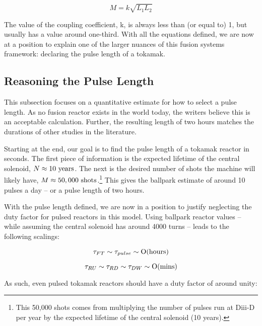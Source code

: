 \begin{equation}
	M = k \sqrt{ L_1 L_2 }
\end{equation}

The value of the coupling coefficient, k, is always less than (or equal to) 1, but usually has a value around one-third. With all the equations defined, we are now at a position to explain one of the larger nuances of this fusion systems framework: declaring the pulse length of a tokamak.

\subsection{Reasoning the Pulse Length}

\label{section:pulse}

This subsection focuses on a quantitative estimate for how to select a pulse length. As no fusion reactor exists in the world today, the writers believe this is an acceptable calculation. Further, the resulting length of two hours matches the durations of other studies in the literature.

Starting at the end, our goal is to find the pulse length of a tokamak reactor in seconds.  The first piece of information is the expected lifetime of the central solenoid, $ N \approx 10 \ \textnormal{years} $. The next is the desired number of shots the machine will likely have, $ M \approx 50,000 \ \textnormal{shots} $.\footnote{This 50,000 shots comes from multiplying the number of pulses run at Diii-D per year by the expected lifetime of the central solenoid (10 years).\cite{diiid}} This gives the ballpark estimate of around 10 pulses a day -- or a pulse length of two hours.

With the pulse length defined, we are now in a position to justify neglecting the duty factor for pulsed reactors in this model. Using ballpark reactor values -- while assuming the central solenoid has around 4000 turns -- leads to the following scalings:

\begin{equation}
	\tau_{FT} \sim \tau_{pulse} \sim \textnormal{O(hours)}
\end{equation}

\begin{equation}
	\tau_{RU} \sim \tau_{RD} \sim \tau_{DW} \sim \textnormal{O(mins)}
\end{equation}

As such, even pulsed tokamak reactors should have a duty factor of around unity:

